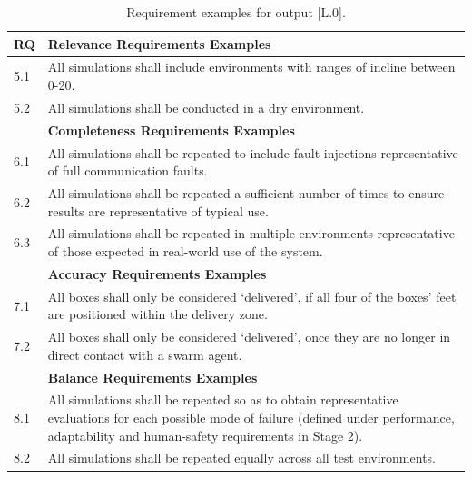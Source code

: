 \documentclass[runningheads]{llncs}
\begin{document}
\tiny
\begin{table}[!t]%
	\centering
	\begin{tabular}{p{0.6cm} p{11.6cm}}
		\textbf{RQ} & \textbf{Relevance Requirements Examples} \\
		\hline
		5.1 & All simulations shall include environments with ranges of incline between 0-20\textdegree.\\
		\hline
		5.2 & All simulations shall be conducted in a dry environment.\\
		\hline
		& \textbf{Completeness Requirements Examples} \\
		\hline
		6.1 & All simulations shall be repeated to include fault injections representative of full communication faults.\\
		\hline
		6.2 & All simulations shall be repeated a sufficient number of times to ensure results are representative of typical use.\\
		\hline
		6.3 & All simulations shall be repeated in multiple environments representative of those expected in real-world use of the system.\\
		\hline
		& \textbf{Accuracy Requirements Examples} \\
		\hline
		7.1 & All boxes shall only be considered `delivered’, if all four of the boxes’ feet are positioned within the delivery zone.\\
		\hline
		7.2 & All boxes shall only be considered `delivered’, once they are no longer in direct contact with a swarm agent.\\
		\hline
		& \textbf{Balance Requirements Examples} \\
		\hline
		8.1 & All simulations shall be repeated so as to obtain representative evaluations for each possible mode of failure (defined under performance, adaptability and human-safety requirements in Stage 2).\\
		\hline
		8.2 & All simulations shall be repeated equally across all test environments.\\
		\hline
	\end{tabular}
	\caption{Requirement examples for output [L.0].}
	\label{tab:L0_req}
		\vspace{-4ex}
\end{table}
\normalsize
\end{document}
